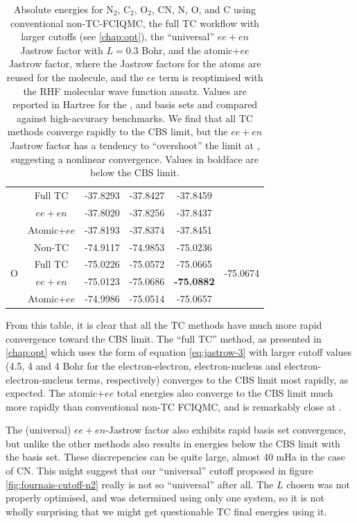 \begin{table}[htbp]
\begin{tabular}{c|c|ccc||c}
    & Full TC & -37.8293 & -37.8427 & -37.8459 & \\
    & $ee+en$ & -37.8020 & -37.8256 & -37.8437 &  \\
    & Atomic+$ee$ & -37.8193 & -37.8374 & -37.8451 &  \\
    \hline
    \multirow{4}{*}{O} & Non-TC & -74.9117 & -74.9853 & -75.0236 & \multirow{4}{*}{-75.0674} \\
    & Full TC & -75.0226 & -75.0572 & -75.0665 &  \\
    & $ee+en$ & -75.0123 & -75.0686 & \textbf{-75.0882} &  \\
    & Atomic+$ee$ & -74.9986 & -75.0514 & -75.0657 &  \\
    \end{tabular}
    \caption{
    Absolute energies for N$_2$, C$_2$, O$_2$, CN, N, O, and C using conventional non-TC-FCIQMC, the full TC workflow with larger cutoffs (see \autoref{chap:opt}), the ``universal'' $ee+en$ Jastrow factor with $L=0.3$ Bohr, and the atomic$+ee$ Jastrow factor, where the Jastrow factors for the atoms are reused for the molecule, and the $ee$ term is reoptimised with the RHF molecular wave function ansatz. Values are reported in Hartree for the \vdz, \vtz and \vqz basis sets and compared against high-accuracy benchmarks.\supercite{fellerSurvey2008,bytautasCorrelation2005} We find that all TC methods converge rapidly to the CBS limit, but the $ee+en$ Jastrow factor has a tendency to ``overshoot'' the limit at \vqz, suggesting a nonlinear convergence. Values in boldface are below the CBS limit.
    }
    \label{tbl:universal-absE}
\end{table}

From this table, it is clear that all the TC methods have much more rapid convergence toward the \gls{CBS} limit. The ``full TC'' method, as presented in \autoref{chap:opt} which uses the form of equation \ref{eq:jastrow-3} with larger cutoff values (4.5, 4 and 4 Bohr for the electron-electron, electron-nucleus and electron-electron-nucleus terms, respectively) converges to the CBS limit most rapidly, as expected. The atomic$+ee$ total energies also converge to the CBS limit much more rapidly than conventional non-TC FCIQMC, and is remarkably close at \vqz. 

The (universal) $ee+en$-Jastrow factor also exhibits rapid basis set convergence, but unlike the other methods also results in energies below the CBS limit with the \vqz basis set. These discrepencies can be quite large, almost 40 mHa in the case of CN. This might suggest that our ``universal'' cutoff proposed in figure \ref{fig:fournais-cutoff-n2} really is not so ``universal'' after all. The $L$ chosen was not properly optimised, and was determined using only one system, so it is not wholly surprising that we might get questionable TC final energies using it.

